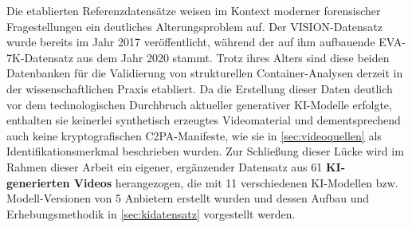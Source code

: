 Die etablierten Referenzdatensätze weisen im Kontext moderner forensischer Fragestellungen ein deutliches Alterungsproblem auf. Der VISION-Datensatz wurde bereits im Jahr 2017 veröffentlicht, während der auf ihm aufbauende EVA-7K-Datensatz aus dem Jahr 2020 stammt. Trotz ihres Alters sind diese beiden Datenbanken für die Validierung von strukturellen Container-Analysen derzeit in der wissenschaftlichen Praxis etabliert. Da die Erstellung dieser Daten deutlich vor dem technologischen Durchbruch aktueller generativer KI-Modelle erfolgte, enthalten sie keinerlei synthetisch erzeugtes Videomaterial und dementsprechend auch keine kryptografischen C2PA-Manifeste, wie sie in \cref{sec:videoquellen} als Identifikationsmerkmal beschrieben wurden. Zur Schließung dieser Lücke wird im Rahmen dieser Arbeit ein eigener, ergänzender Datensatz aus 61 \textbf{KI-generierten Videos} herangezogen, die mit 11 verschiedenen KI-Modellen bzw. Modell-Versionen von 5 Anbietern erstellt wurden und dessen Aufbau und Erhebungsmethodik in \cref{sec:kidatensatz} vorgestellt werden.\\

